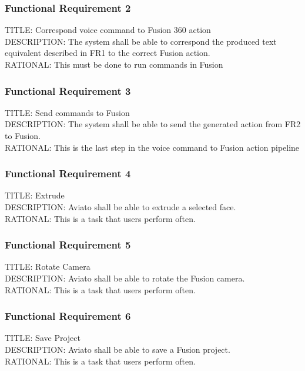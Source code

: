 \documentclass[onecolumn, draftclsnofoot,10pt, compsoc]{IEEEtran}
\def \botname{Aviato }
\begin{document}
        \subsubsection{Functional Requirement 2}
        TITLE: Correspond voice command to Fusion 360 action  \\
        DESCRIPTION: The system shall be able to correspond the produced text equivalent described in FR1 to the correct Fusion action. \\
        RATIONAL: This must be done to run commands in Fusion 
        
        \subsubsection{Functional Requirement 3}
        TITLE: Send commands to Fusion  \\
        DESCRIPTION: The system shall be able to send the generated action from FR2 to Fusion. \\
        RATIONAL: This is the last step in the voice command to Fusion action pipeline 
        
        \subsubsection{Functional Requirement 4}
        TITLE: Extrude \\
        DESCRIPTION: \botname shall be able to extrude a selected face. \\
        RATIONAL: This is a task that users perform often.
        
        \subsubsection{Functional Requirement 5}
        TITLE: Rotate Camera \\
        DESCRIPTION: \botname shall be able to rotate the Fusion camera. \\
        RATIONAL: This is a task that users perform often.
        
        \subsubsection{Functional Requirement 6}
        TITLE: Save Project \\
        DESCRIPTION: \botname shall be able to save a Fusion project. \\
        RATIONAL: This is a task that users perform often.
        
\end{document}
